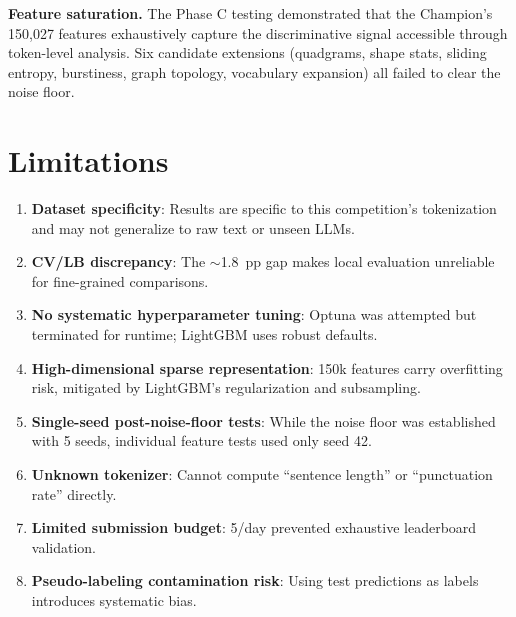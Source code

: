 \documentclass[11pt]{article}
\begin{document}
\textbf{Feature saturation.}
The Phase C testing demonstrated that the Champion's 150,027 features exhaustively capture the discriminative signal accessible through token-level analysis. Six candidate extensions (quadgrams, shape stats, sliding entropy, burstiness, graph topology, vocabulary expansion) all failed to clear the noise floor.

\section{Limitations}

\begin{enumerate}
    \item \textbf{Dataset specificity}: Results are specific to this competition's tokenization and may not generalize to raw text or unseen LLMs.
    \item \textbf{CV/LB discrepancy}: The ${\sim}$1.8~pp gap makes local evaluation unreliable for fine-grained comparisons.
    \item \textbf{No systematic hyperparameter tuning}: Optuna was attempted but terminated for runtime; LightGBM uses robust defaults.
    \item \textbf{High-dimensional sparse representation}: 150k features carry overfitting risk, mitigated by LightGBM's regularization and subsampling.
    \item \textbf{Single-seed post-noise-floor tests}: While the noise floor was established with 5 seeds, individual feature tests used only seed 42.
    \item \textbf{Unknown tokenizer}: Cannot compute ``sentence length'' or ``punctuation rate'' directly.
    \item \textbf{Limited submission budget}: 5/day prevented exhaustive leaderboard validation.
    \item \textbf{Pseudo-labeling contamination risk}: Using test predictions as labels introduces systematic bias.
\end{enumerate}

\end{document}
